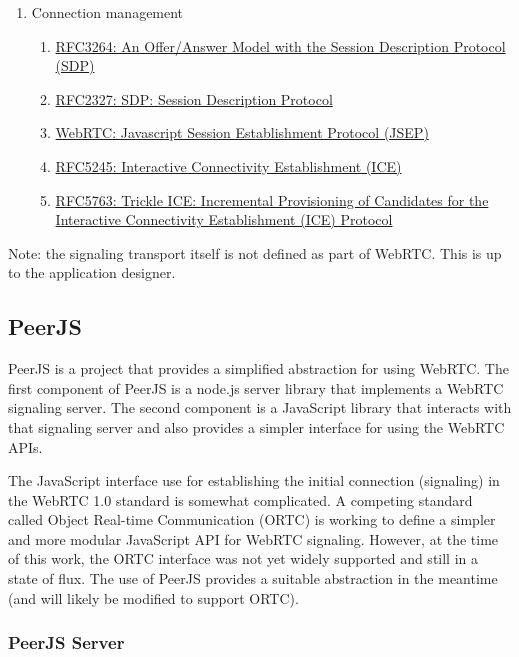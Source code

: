 \documentclass[9pt]{extarticle}
\begin{document}
\begin{multicols}{2}
\begin{enumerate}
\item Connection management
    \begin{enumerate}
    \item \href{https://tools.ietf.org/html/rfc3264}{RFC3264: An Offer/Answer Model with the Session Description Protocol (SDP)}
    \item \href{https://tools.ietf.org/html/rfc2327}{RFC2327: SDP: Session Description Protocol}
    \item \href{https://tools.ietf.org/html/draft-ietf-rtcweb-jsep-09}{WebRTC: Javascript Session Establishment Protocol (JSEP)}
    \item \href{https://tools.ietf.org/html/rfc5245}{RFC5245: Interactive Connectivity Establishment (ICE)}
    \item \href{https://tools.ietf.org/html/draft-ietf-mmusic-trickle-ice-02}{RFC5763: Trickle ICE: Incremental Provisioning of Candidates for the Interactive Connectivity Establishment (ICE) Protocol}
    \end{enumerate}
\end{enumerate}

Note: the signaling transport itself is not defined as part of WebRTC.
This is up to the application designer.

\subsection{PeerJS}

PeerJS is a project that provides a simplified abstraction for using
WebRTC. The first component of PeerJS is a node.js server library that
implements a WebRTC signaling server. The second component is
a JavaScript library that interacts with that signaling server and
also provides a simpler interface for using the WebRTC APIs.

The JavaScript interface use for establishing the initial connection
(signaling) in the WebRTC 1.0 standard is somewhat complicated.
A competing standard called Object Real-time Communication (ORTC) is
working to define a simpler and more modular JavaScript API for WebRTC
signaling. However, at the time of this work, the ORTC interface was
not yet widely supported and still in a state of flux.  The use of
PeerJS provides a suitable abstraction in the meantime (and will
likely be modified to support ORTC).

\subsubsection{PeerJS Server}


\end{multicols}
\end{document}
